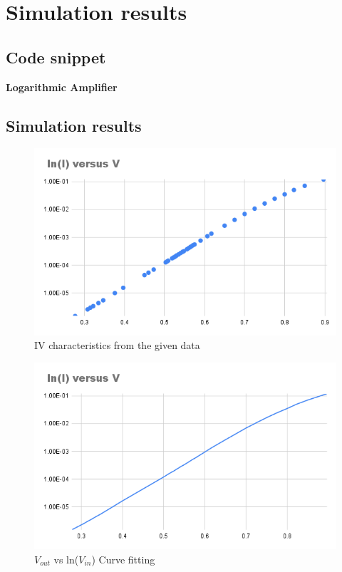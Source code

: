\documentclass[12pt]{article}
\begin{document}
\section{Simulation results}%
\subsection{Code snippet}

\begin{center}
\textbf{Logarithmic Amplifier}
\end{center}


\subsection{Simulation results}


\begin{figure}[H]
\begin{center}
\includegraphics[scale = 0.6]{Q1.png}
\caption{IV characteristics from the given data}
\end{center}
\end{figure}

\begin{figure}[H]
\begin{center}
\includegraphics[scale = 0.6]{Q2.png}
\caption{$V_{out}$ vs ln($V_{in}$) Curve fitting}
\end{center}
\end{figure}
\end{document}
